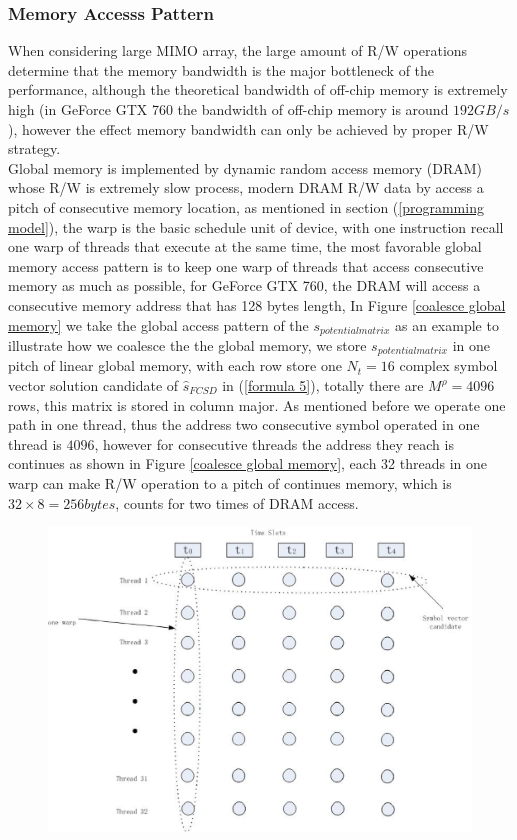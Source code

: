 \documentclass[12pt,a4paper,final]{article}
\begin{document}
\begin{spacing}{2.5}
\subsubsection{Memory Accesss Pattern}
  When considering large MIMO array, the large amount of R/W operations determine that the memory bandwidth is the major bottleneck of the performance,  although the theoretical bandwidth of off-chip memory is extremely high (in GeForce GTX 760 the bandwidth of off-chip memory is around $192 GB/s$), however the effect memory bandwidth can only be achieved by proper R/W strategy.\\
  Global memory is implemented by dynamic random access memory (DRAM) whose R/W is extremely slow process, modern DRAM R/W data by access a pitch of consecutive memory location, as mentioned in section (\ref{programming model}), the warp is the basic schedule unit of device, with one instruction recall one warp of threads that execute at the same time, the most favorable global memory access pattern is to keep one warp of threads that access consecutive memory as much as possible, for GeForce GTX 760, the DRAM will access a consecutive memory address that has 128 bytes length, In Figure \ref{coalesce global memory} we take the global access pattern of the $\mathit{s_{potential matrix}}$ as an example to illustrate how we coalesce the the global memory,
we store $\mathit{s_{potential matrix}}$ in one pitch of linear global memory, with each row store one $N_{t}=16$ complex symbol vector solution candidate of $\hat{s}_{FCSD}$ in (\ref{formula 5}), totally there are $M^{\rho}=4096$ rows, this matrix is stored in column major. As mentioned before we operate one path in one thread, thus the address two consecutive symbol operated in one thread is $4096$, however for consecutive threads the address they reach is continues as shown in Figure \ref{coalesce global memory}, each 32 threads in one warp can make R/W operation to a pitch of continues memory, which is $32\times 8=256 bytes$, counts for two times of DRAM access.
\begin{figure}[htb]
\centering
\includegraphics[scale=0.63]{coalescing_global_memory.eps}

\end{figure}
\end{spacing}
\end{document}
